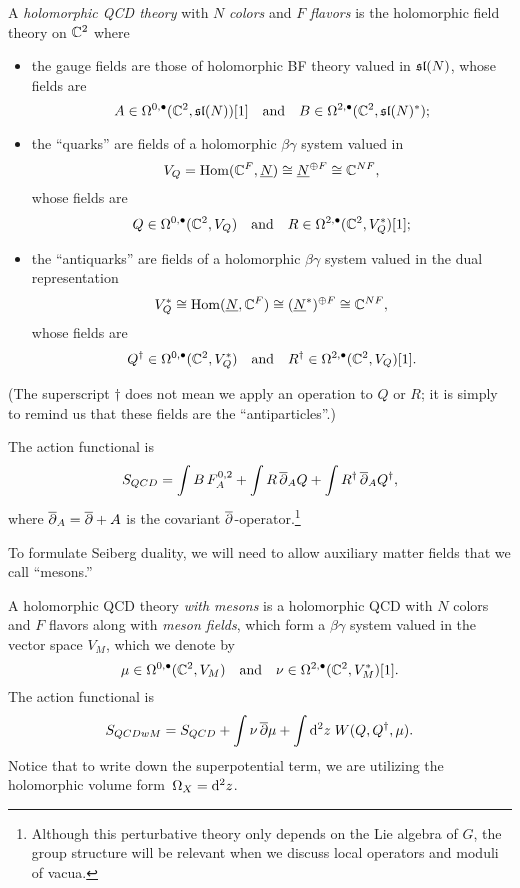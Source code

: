 \documentclass[11pt]{amsart}
\begin{document}
\begin{dfn}
A {\em holomorphic QCD theory} with $N$ {\em colors} and $F$ {\em flavors} is the holomorphic field theory on $\CC^2$ where
\begin{itemize}
\item the gauge fields are those of holomorphic BF theory valued in $\sl(N)$, whose fields are
\[
A \in \Omega^{0,\bu}(\CC^2 , \sl(N))[1] \quad\text{and}\quad B \in \Omega^{2,\bu}(\CC^2, \sl(N)^*);
\]
\item the ``quarks'' are fields of a holomorphic $\beta\gamma$ system valued in 
\[
V_Q = \Hom(\CC^F, \underline{N}) \cong \underline{N}^{\oplus F} \cong \CC^{NF},
\] 
whose fields are
\[
Q \in \Omega^{0,\bu}(\CC^2 , V_Q) \quad\text{and}\quad R \in \Omega^{2,\bu}(\CC^2 , V_Q^*)[1];
\]
\item the ``antiquarks'' are fields of a holomorphic $\beta\gamma$ system valued in the dual representation 
\[
V^*_Q \cong \Hom(\underline{N}, \CC^F) \cong (\underline{N}^*)^{\oplus F} \cong \CC^{NF}, 
\]
whose fields are
\[
Q^\dag \in \Omega^{0,\bu}(\CC^2 , V^*_Q) \quad\text{and}\quad R^\dag \in \Omega^{2,\bu}(\CC^2 , V_Q) [1].
\]
\end{itemize}
(The superscript $\dag$ does not mean we apply an operation to $Q$ or $R$; 
it is simply to remind us that these fields are the ``antiparticles''.)

The action functional is
\[
S_{QCD} = \int B\, F^{0,2}_A + \int R \,\dbar_A Q + \int R^\dag \,\dbar_A Q^\dag,
\]
where $\dbar_A = \dbar + A$ is the covariant $\dbar$-operator.\footnote{Although this perturbative theory only depends on the Lie algebra of $G$, the group structure will be relevant when we discuss local operators and moduli of vacua.}
\end{dfn}

To formulate Seiberg duality, we will need to allow auxiliary matter fields that we call ``mesons.''

\begin{dfn}
A holomorphic QCD theory {\em with mesons}
is a holomorphic QCD with $N$ colors and $F$ flavors along with {\em meson fields}, which form a $\beta\gamma$ system valued in the vector space $V_M$, which we denote by
\[
\mu \in \Omega^{0,\bu}(\CC^2 , V_M) \quad\text{and}\quad \nu \in \Omega^{2,\bu}(\CC^2 , V_M^*) [1] .
\]
The action functional is
\[
S_{QCDwM} = S_{QCD} + \int \nu \,\dbar \mu + \int \d^2 z \; W(Q, Q^\dag, \mu) .
\] 
Notice that to write down the superpotential term, we are utilizing the holomorphic volume form~$\Omega_X = \d^2 z$. 
\end{dfn}
\end{document}

